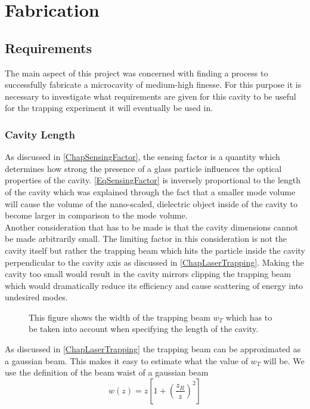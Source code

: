 \chapter{Fabrication}

\section{Requirements}
The main aspect of this project was concerned with finding a process to successfully fabricate a microcavity of medium-high finesse. For this purpose it is necessary to investigate what requirements are given for this cavity to be useful for the trapping experiment it will eventually be used in.
\subsection{Cavity Length}
As discussed in \autoref{ChapSensingFactor}, the sensing factor is a quantity which determines how strong the presence of a glass particle influences the optical properties of the cavity. \autoref{EqSensingFactor} is inversely proportional to the length of the cavity which was explained through the fact that a smaller mode volume will cause the volume of the nano-scaled, dielectric object inside of the cavity to become larger in comparison to the mode volume.\\
Another consideration that has to be made is that the cavity dimensions cannot be made arbitrarily small. The limiting factor in this consideration is not the cavity itself but rather the trapping beam which hits the particle inside the cavity perpendicular to the cavity axis as discussed in \autoref{ChapLaserTrapping}. Making the cavity too small would result in the cavity mirrors clipping the trapping beam which would dramatically reduce its efficiency and cause scattering of energy into undesired modes.
\begin{figure}[H]\label{FigBeamWidth}
	
	\caption{This figure shows the width of the trapping beam $w_{\si{T}}$ which has to be taken into account when specifying the length of the cavity.}
\end{figure}
As discussed in \autoref{ChapLaserTrapping} the trapping beam can be approximated as a gaussian beam. This makes it easy to estimate what the value of $w_{\si{T}}$ will be. We use the definition of the beam waist of a gaussian beam
\begin{equation}
	w(z)=z\left[1+\left(\frac{z_{\si{R}}}{z}\right)^2\right]
\end{equation}
